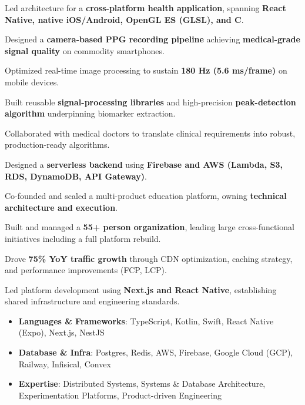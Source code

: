 \documentclass[10pt,a4paper]{resume}
\begin{document}
\begin{highlights}
    \item Led architecture for a \textbf{cross-platform health application}, spanning \textbf{React Native, native iOS/Android, OpenGL ES (GLSL), and C}.
    \item Designed a \textbf{camera-based PPG recording pipeline} achieving \textbf{medical-grade signal quality} on commodity smartphones.
    \item Optimized real-time image processing to sustain \textbf{180 Hz (5.6 ms/frame)} on mobile devices.
    \item Built reusable \textbf{signal-processing libraries} and high-precision \textbf{peak-detection algorithm} underpinning biomarker extraction.
    \item Collaborated with medical doctors to translate clinical requirements into robust, production-ready algorithms.
    \item Designed a \textbf{serverless backend} using \textbf{Firebase and AWS (Lambda, S3, RDS, DynamoDB, API Gateway)}.
\end{highlights}
\divider

\begin{highlights}
    \item Co-founded and scaled a multi-product education platform, owning \textbf{technical architecture and execution}.
    \item Built and managed a \textbf{55+ person organization}, leading large cross-functional initiatives including a full platform rebuild.
    \item Drove \textbf{75\% YoY traffic growth} through CDN optimization, caching strategy, and performance improvements (FCP, LCP).
    \item Led platform development using \textbf{Next.js and React Native}, establishing shared infrastructure and engineering standards.
\end{highlights}

\begin{itemize}
    \item \textbf{Languages \& Frameworks}: TypeScript, Kotlin, Swift, React Native (Expo), Next.js, NestJS
    \item \textbf{Database \& Infra}: Postgres, Redis, AWS, Firebase, Google Cloud (GCP), Railway, Infisical, Convex
    \item \textbf{Expertise}: Distributed Systems, Systems \& Database Architecture, Experimentation Platforms, Product-driven Engineering
\end{itemize}

\end{document}
